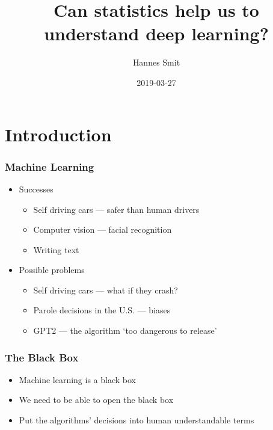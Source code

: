 \documentclass[aspectratio=169]{beamer}
\title{Can statistics help us to understand deep learning?}
\author{Hannes Smit}
\date{2019-03-27}
\begin{document}
\setcounter{showProgressBar}{0}
\setcounter{showSlideNumbers}{0}

\frame{\titlepage}

\setcounter{framenumber}{0}
\setcounter{showProgressBar}{1}
\setcounter{showSlideNumbers}{1}

\section{Introduction}
\begin{frame}
	\frametitle{Machine Learning}
	\begin{itemize}
		\item Successes
		      \begin{itemize}
			      \item Self driving cars --- safer than human drivers
			      \item Computer vision --- facial recognition
			      \item Writing text
		      \end{itemize}
		\item Possible problems
		      \begin{itemize}
			      \item Self driving cars --- what if they crash?
			      \item Parole decisions in the U.S. --- biases
			      \item GPT2 --- the algorithm `too dangerous to release'
		      \end{itemize}
	\end{itemize}
\end{frame}

\begin{frame}
	\frametitle{The Black Box}
	\begin{itemize}
		\item Machine learning is a black box
		\item We need to be able to open the black box
		\item Put the algorithms' decisions into human understandable terms
	\end{itemize}
\end{frame}
\end{document}
